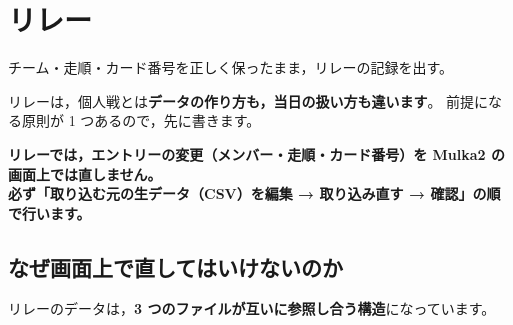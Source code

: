\section{リレー}
\tRELAY

\begin{GoalC}
チーム・走順・カード番号を正しく保ったまま，リレーの記録を出す。
\end{GoalC}

リレーは，個人戦とは\textbf{データの作り方も，当日の扱い方も違います}。
前提になる原則が 1 つあるので，先に書きます。

\begin{Fail}
\textbf{リレーでは，エントリーの変更（メンバー・走順・カード番号）を
Mulka2 の画面上では直しません。}\\
\textbf{必ず「取り込む元の生データ（CSV）を編集 → 取り込み直す → 確認」の順で行います。}
\end{Fail}

\subsection*{なぜ画面上で直してはいけないのか}

リレーのデータは，\textbf{3 つのファイルが互いに参照し合う構造}になっています。

